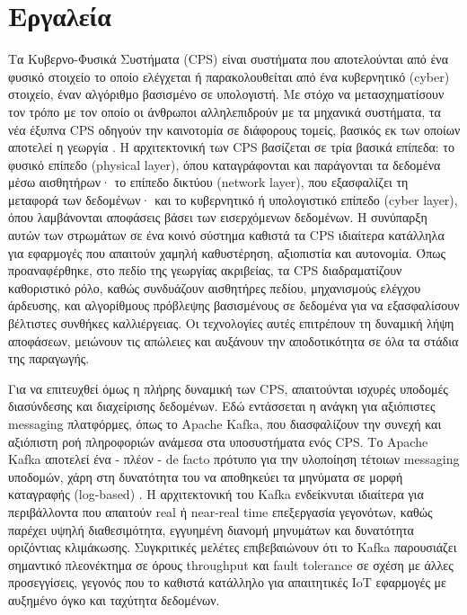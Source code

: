 \chapter{Εργαλεία}

Τα Κυβερνο-Φυσικά Συστήματα (CPS) είναι συστήματα που αποτελούνται από ένα
φυσικό στοιχείο το οποίο ελέγχεται ή παρακολουθείται από ένα κυβερνητικό
(cyber) στοιχείο, έναν αλγόριθμο βασισμένο σε υπολογιστή. Με στόχο να
μετασχηματίσουν τον τρόπο με τον οποίο οι άνθρωποι αλληλεπιδρούν με τα μηχανικά
συστήματα, τα νέα έξυπνα CPS οδηγούν την καινοτομία σε διάφορους τομείς,
βασικός εκ των οποίων αποτελεί η γεωργία \cite{cps}. Η αρχιτεκτονική των CPS
βασίζεται σε τρία βασικά επίπεδα: το φυσικό επίπεδο (physical layer), όπου
καταγράφονται και παράγονται τα δεδομένα μέσω αισθητήρων· το επίπεδο δικτύου
(network layer), που εξασφαλίζει τη μεταφορά των δεδομένων· και το κυβερνητικό
ή υπολογιστικό επίπεδο (cyber layer), όπου λαμβάνονται αποφάσεις βάσει των
εισερχόμενων δεδομένων. Η συνύπαρξη αυτών των στρωμάτων σε ένα κοινό σύστημα
καθιστά τα CPS ιδιαίτερα κατάλληλα για εφαρμογές που απαιτούν χαμηλή
καθυστέρηση, αξιοπιστία και αυτονομία. Όπως προαναφέρθηκε, στο πεδίο της
γεωργίας ακριβείας, τα CPS διαδραματίζουν καθοριστικό ρόλο, καθώς συνδυάζουν
αισθητήρες πεδίου, μηχανισμούς ελέγχου άρδευσης, και αλγορίθμους πρόβλεψης
βασισμένους σε δεδομένα για να εξασφαλίσουν βέλτιστες συνθήκες καλλιέργειας. Οι
τεχνολογίες αυτές επιτρέπουν τη δυναμική λήψη αποφάσεων, μειώνουν τις απώλειες
και αυξάνουν την αποδοτικότητα σε όλα τα στάδια της παραγωγής.

Για να επιτευχθεί όμως η πλήρης δυναμική των CPS, απαιτούνται ισχυρές υποδομές
διασύνδεσης και διαχείρισης δεδομένων. Εδώ εντάσσεται η ανάγκη για αξιόπιστες
messaging πλατφόρμες, όπως το Apache Kafka, που διασφαλίζουν την συνεχή και
αξιόπιστη ροή πληροφοριών ανάμεσα στα υποσυστήματα ενός CPS. Το Apache Kafka
αποτελεί ένα - πλέον - de facto πρότυπο για την υλοποίηση τέτοιων messaging
υποδομών, χάρη στη δυνατότητα του να αποθηκεύει τα μηνύματα σε μορφή καταγραφής
(log-based) \cite{kafkabdd}. Η αρχιτεκτονική του Kafka ενδείκνυται ιδιαίτερα
για περιβάλλοντα που απαιτούν real ή near-real time επεξεργασία γεγονότων,
καθώς παρέχει υψηλή διαθεσιμότητα, εγγυημένη διανομή μηνυμάτων και δυνατότητα
οριζόντιας κλιμάκωσης. Συγκριτικές μελέτες \cite{rtkafka} επιβεβαιώνουν ότι το
Kafka παρουσιάζει σημαντικό πλεονέκτημα σε όρους throughput και fault tolerance
σε σχέση με άλλες προσεγγίσεις, γεγονός που το καθιστά κατάλληλο για
απαιτητικές IoT εφαρμογές με αυξημένο όγκο και ταχύτητα δεδομένων.

